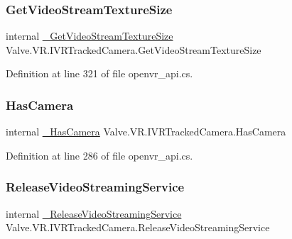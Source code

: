 \subsubsection{\texorpdfstring{GetVideoStreamTextureSize}{GetVideoStreamTextureSize}}
{\footnotesize\ttfamily internal \mbox{\hyperlink{struct_valve_1_1_v_r_1_1_i_v_r_tracked_camera_a8a269f673569d9678c1389d30b523de4}{\+\_\+\+Get\+Video\+Stream\+Texture\+Size}} Valve.\+V\+R.\+I\+V\+R\+Tracked\+Camera.\+Get\+Video\+Stream\+Texture\+Size}



Definition at line 321 of file openvr\+\_\+api.\+cs.

\mbox{\label{struct_valve_1_1_v_r_1_1_i_v_r_tracked_camera_a75e04ffd8ca63f8e4c7ddda1421f14bd}} 
\subsubsection{\texorpdfstring{HasCamera}{HasCamera}}
{\footnotesize\ttfamily internal \mbox{\hyperlink{struct_valve_1_1_v_r_1_1_i_v_r_tracked_camera_a4138984fea114155a7a9f4cd9344abcf}{\+\_\+\+Has\+Camera}} Valve.\+V\+R.\+I\+V\+R\+Tracked\+Camera.\+Has\+Camera}



Definition at line 286 of file openvr\+\_\+api.\+cs.

\mbox{\label{struct_valve_1_1_v_r_1_1_i_v_r_tracked_camera_a9fbbbc954c14b2f6e25c62fc641b48ca}} 
\subsubsection{\texorpdfstring{ReleaseVideoStreamingService}{ReleaseVideoStreamingService}}
{\footnotesize\ttfamily internal \mbox{\hyperlink{struct_valve_1_1_v_r_1_1_i_v_r_tracked_camera_ab377dd8e389c9aa7962d424d91a9043b}{\+\_\+\+Release\+Video\+Streaming\+Service}} Valve.\+V\+R.\+I\+V\+R\+Tracked\+Camera.\+Release\+Video\+Streaming\+Service}



